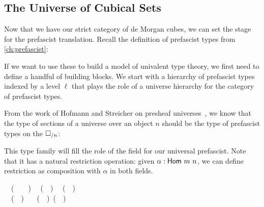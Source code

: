 
\subsection{The Universe of Cubical Sets}

Now that we have our strict category of de Morgan cubes, we can set the stage 
for the prefascist translation. Recall the definition 
of prefascist types from \cref{ch:prefascist}:


If we want to use these to build a model of univalent type theory, we first 
need to define a handful of building blocks.
% 
We start with a hierarchy of prefascist types indexed by a level \( \ell \) 
that plays the role of a universe hierarchy for the category of prefascist types.
 
From the work of Hofmann and Streicher on presheaf 
universes~, we know that the type of sections of a 
universe over an object \( n \) should be the type of prefascist types on the 
% 
% 
\( \square_{/n} \):


This type family will fill the role of the field  for our universal 
prefascist.
% 
Note that it has a natural restriction operation: given \( \alpha : \func{Hom}~m~n \), 
we can define restriction as composition with \( \alpha \) in both fields.
% 
% 
\begin{code}
\>[0]~\AgdaSymbol{:}~(~\AgdaSymbol{:}~~~)~%
~(~~)~%
~(~~)\<%
\\
\>[0]~~(~~)~%
\AgdaSymbol{=}~~(~~)~(~~)\<%
\end{code}

